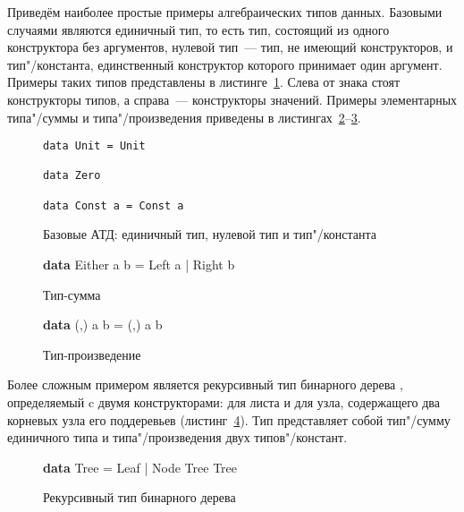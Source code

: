 Приведём наиболее простые примеры алгебраических типов данных.
Базовыми случаями являются единичный тип, то есть тип, состоящий
из одного конструктора без аргументов, нулевой тип~--- тип, не
имеющий конструкторов, и тип"/константа, единственный конструктор
которого принимает один аргумент. Примеры таких типов
представлены в листинге~\ref{list:base}. Слева от знака \texttts{=}
стоят конструкторы типов, а справа~--- конструкторы значений.
Примеры элементарных типа"/суммы и типа"/произведения приведены
в листингах~\ref{list:sum}--\ref{list:prod}.
\begin{figure}[h]
\begin{framed}
\vspace{-0.25cm}
\begin{lstlisting}
data Unit = Unit

data Zero

data Const a = Const a
\end{lstlisting}
\vspace{-0.25cm}
\end{framed}
\caption{Базовые АТД: единичный тип, нулевой тип и тип"/константа}
\label{list:base}
\end{figure}
\begin{figure}[h]
\begin{framed}
{\ttfamily\small
\textbf{data} Either a b = Left a | Right b}
\end{framed}
\caption{Тип-сумма}
\label{list:sum}
\end{figure}
\begin{figure}[h]
\begin{framed}
{\ttfamily\small
\textbf{data} (,) a b = (,) a b}
\end{framed}
\caption{Тип-произведение}
\label{list:prod}
\end{figure}

Более сложным примером является рекурсивный тип бинарного дерева
, определяемый c двумя конструкторами:  для
листа и  для узла, содержащего два корневых узла его
поддеревьев (листинг~\ref{list:bin-tree}). Тип 
представляет собой тип"/сумму единичного типа и типа"/произведения
двух типов"/констант.
\begin{figure}[h]
\begin{framed}
{\ttfamily\small
\textbf{data} Tree = Leaf | Node Tree Tree}
\end{framed}
\caption{Рекурсивный тип бинарного дерева}
\label{list:bin-tree}
\end{figure}

